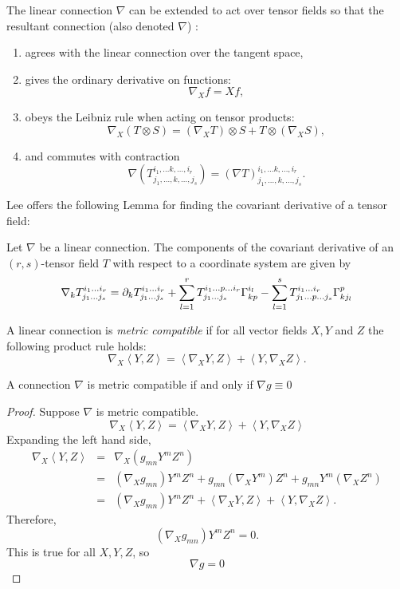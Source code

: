 \pagebreak
The linear connection $\nabla$ can be extended to act over tensor fields so that the resultant connection (also denoted $\nabla$) \cite{Lee}:
\begin{enumerate}
\item agrees with the linear connection over the tangent space,
\item gives the ordinary derivative on functions:
\[ \nabla_X f = Xf, \]
\item obeys the Leibniz rule when acting on tensor products:
\[ \nabla_X(T\otimes S)= (\nabla_X T)\otimes S + T\otimes(\nabla_X S),\]
\item and commutes with contraction 
\[ \nabla(T^{i_1,\dots k, \dots ,i_r}_{j_1,\dots,k,\dots ,j_s})=(\nabla T)^{i_1,\dots k, \dots ,i_r}_{j_1,\dots,k,\dots ,j_s}.\]
\end{enumerate}

Lee \cite{Lee} offers the following Lemma for finding the covariant derivative of a tensor field:

\begin{lemma}
Let $\nabla$ be a linear connection. The components of the covariant derivative of an $(r,s)$-tensor field $T$ with respect to a coordinate system are given by
\begin{equation} \nabla_k T^{i_1\dots i_r}_{j_1\dots j_s}={\partial}_k T^{i_1\dots i_r}_{j_1\dots j_s} + \sum^{r}_{l=1}T^{i_1\dots p \dots i_r}_{j_1\dots j_s} \Gamma^{i_l}_{kp}-\sum^{s}_{l=1}T^{i_1\dots i_r}_{j_1\dots p\dots j_s} \Gamma^{p}_{k j_l} \label{covdevtensor}\end{equation}
\end{lemma}

A linear connection is \textit{metric compatible} if for all vector fields $X,Y$ and $Z$ the following product rule holds:
\[ \nabla_X \left< Y,Z \right> = \left<\nabla_X Y, Z \right> + \left<Y, \nabla_X Z \right>. \]

\begin{lemma}
A connection $\nabla$ is metric compatible if and only if $\nabla g\equiv 0$
\end{lemma}
\begin{proof}
Suppose $\nabla$ is metric compatible.
\begin{equation}\nabla_X \left< Y,Z \right> = \left<\nabla_X Y, Z \right> + \left<Y, \nabla_X Z \right> \label{eq:metriccompatible}\end{equation}
Expanding the left hand side,
\[\begin{array}{lcl} \nabla_X \left< Y,Z \right> &=& \nabla_X (g_{mn}Y^mZ^n)\\
&=& (\nabla_X g_{mn})Y^mZ^n + g_{mn}(\nabla_X Y^m)Z^n + g_{mn}Y^m(\nabla_X Z^n)\\
&=& (\nabla_X g_{mn})Y^mZ^n + \left<\nabla_X Y, Z \right> + \left<Y, \nabla_X Z \right>. \end{array}\]
Therefore, 
\[ (\nabla_X g_{mn})Y^mZ^n=0. \]
This is true for all $X,Y,Z$, so
\[ \nabla g =0 \]
\end{proof}

